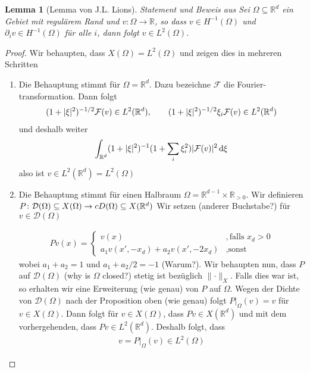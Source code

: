 \documentclass{scrartcl}
\newcounter{everything}
\newtheorem{lemma}[everything]{Lemma}
\def\R{\mathbb{R}}
\newcommand{\cD}{\mathcal{D}}
\newcommand{\cF}{\mathcal{F}}
\newcommand{\dif}[1]{\,\mathrm{d} #1}
\newcommand{\norm}[1]{\lVert #1 \rVert}
\DeclarePairedDelimiter{\abs}{|}{|}
\begin{document}
\begin{lemma}[Lemma von J.L. Lions]\label{le:LemmaVonLions}
Statement und Beweis aus \cite{Duv-1976}
Sei $\Omega\subseteq\R^d$ ein Gebiet mit regulärem Rand und $v\colon\Omega\to\R$, so dass $v\in H^{-1}(\Omega)$ und $\partial_iv\in H^{-1}(\Omega)$ für alle $i$, dann folgt $v\in L^2(\Omega)$.
\end{lemma}
\begin{proof}
	Wir behaupten, dass $X(\Omega)=L^2(\Omega)$ und zeigen dies in mehreren Schritten
	\begin{enumerate}
	\item Die Behauptung stimmt für $\Omega=\R^d$. Dazu bezeichne $\cF$ die Fourier-transformation. Dann folgt
	\begin{align*}
		(1+\abs{\xi}^2)^{-1/2}\cF(v)\in L^2(\R^d), \qquad
		(1+\abs{\xi}^2)^{-1/2}\xi_i\cF(v)\in L^2(\R^d)
	\end{align*}
	und deshalb weiter
	\begin{align*}
		\int_{\R^d}(1+\abs{\xi}^2)^{-1}(1+\sum_i\xi_i^2)\abs{\cF(v)}^2\dif\xi
	\end{align*}
	also ist $v\in L^2(\R^d)=L^2(\Omega)$
	
	\item Die Behauptung stimmt für einen Halbraum $\Omega=\R^{d-1}\times\R_{>0}$.
	Wir definieren $P\colon \cD(\Omega)\subseteq X(\Omega)\to\\cD(\Omega)\subseteq X(\R^d)$
	Wir setzen (anderer Buchstabe?) für $v\in \cD(\Omega)$
	
	\begin{align*}
		Pv(x) =\begin{cases}
			v(x) 							&,\text{falls }x_d>0 \\
			a_1 v(x',-x_d)+a_2v(x',-2x_d) 	&,\text{sonst}
		\end{cases}
	\end{align*}
	wobei $a_1+a_2=1$ und $a_1+a_2/2=-1$ (Warum?). Wir behaupten nun, dass $P$ auf $\cD(\Omega)$ (why is $\Omega$ closed?) stetig ist bezüglich $\norm{\cdot}_X$. Falls dies war ist, so erhalten wir eine Erweiterung (wie genau) von $P$ auf $\Omega$.
	Wegen der Dichte von $\cD(\Omega)$ nach der Proposition oben (wie genau) folgt $P\vert_\Omega(v)=v$ für $v\in X(\Omega)$. Dann folgt für $v\in X(\Omega)$, dass $Pv\in X(\R^d)$ und mit dem vorhergehenden, dass $Pv\in L^2(\R^d)$. Deshalb folgt, dass
	\begin{align*}
		v = P\vert_\Omega(v)\in L^2(\Omega)
	\end{align*}
	

\end{enumerate}
\end{proof}
\end{document}
